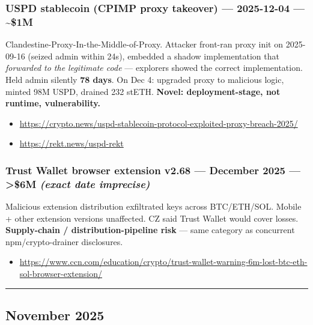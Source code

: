 \subsubsection{USPD stablecoin (CPIMP proxy takeover) --- 2025-12-04 --- \textasciitilde\$1M}\label{uspd-stablecoin-cpimp-proxy-takeover-2025-12-04-1m}

Clandestine-Proxy-In-the-Middle-of-Proxy. Attacker front-ran proxy init on 2025-09-16 (seized admin within 24s), embedded a shadow implementation that \emph{forwarded to the legitimate code} --- explorers showed the correct implementation. Held admin silently \textbf{78 days}. On Dec 4: upgraded proxy to malicious logic, minted 98M USPD, drained 232 stETH. \textbf{Novel: deployment-stage, not runtime, vulnerability.}

\begin{itemize}
\tightlist
\item
  \url{https://crypto.news/uspd-stablecoin-protocol-exploited-proxy-breach-2025/}
\item
  \url{https://rekt.news/uspd-rekt}
\end{itemize}

\subsubsection{\texorpdfstring{Trust Wallet browser extension v2.68 --- December 2025 --- \textgreater\$6M \emph{(exact date imprecise)}}{Trust Wallet browser extension v2.68 --- December 2025 --- \textgreater\$6M (exact date imprecise)}}\label{trust-wallet-browser-extension-v2.68-december-2025-6m-exact-date-imprecise}

Malicious extension distribution exfiltrated keys across BTC/ETH/SOL. Mobile + other extension versions unaffected. CZ said Trust Wallet would cover losses. \textbf{Supply-chain / distribution-pipeline risk} --- same category as concurrent npm/crypto-drainer disclosures.

\begin{itemize}
\tightlist
\item
  \url{https://www.ccn.com/education/crypto/trust-wallet-warning-6m-lost-btc-eth-sol-browser-extension/}
\end{itemize}

\begin{center}\rule{0.5\linewidth}{0.5pt}\end{center}

\subsection{November 2025}\label{november-2025}

